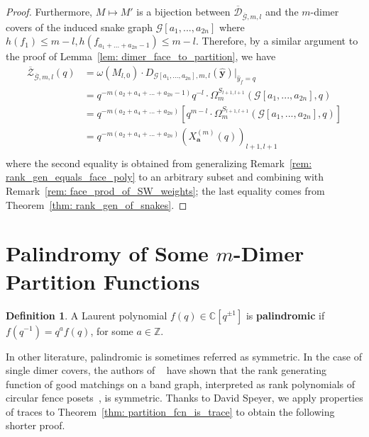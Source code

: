 \documentclass[11pt]{amsart}
\theoremstyle{definition}
\newtheorem{defn}[thm]{Definition}
\theoremstyle{remark}
\numberwithin{equation}{section}
\begin{document}
\begin{proof}
    Furthermore, $M\mapsto M'$ is a bijection between $\overline{\mathcal{D}}_{\overline{\mathcal{G}},m,l}$ and the $m$-dimer covers of the induced snake graph $\mathcal{G}[a_1,...,a_{2n}]$ where $h(f_1)\leq m-l, h(f_{a_1+...+a_{2n}-1})\leq m-l$. Therefore, by a similar argument to the proof of Lemma~\ref{lem: dimer_face_to_partition}, we have
    \begin{equation*}
        \begin{split}
            \overline{\mathcal{Z}}_{\overline{\mathcal{G}},m,l}(q) &= \omega(M_{l,0})\cdot D_{\mathcal{G}[a_1,...,a_{2n}],m,l}(\hat{\mathbf{y}})|_{\hat{y}_f = q}\\
            &= q^{-m(a_2+a_4+...+a_{2n} - 1)}q^{-l}\cdot \Omega^{S_{l+1,l+1}}_m(\mathcal{G}[a_1,...,a_{2n}],q)\\
            &= q^{-m(a_2+a_4+...+a_{2n})}[q^{m-l}\cdot \Omega^{S_{l+1,l+1}}_m(\mathcal{G}[a_1,...,a_{2n}],q)]\\
            &= q^{-m(a_2+a_4+...+a_{2n})}(X^{(m)}_{\mathbf{a}}(q))_{l+1,l+1}\\
        \end{split}
    \end{equation*}
    where the second equality is obtained from generalizing Remark~\ref{rem: rank_gen_equals_face_poly} to an arbitrary subset and combining with Remark~\ref{rem: face_prod_of_SW_weights}; the last equality comes from Theorem~\ref{thm: rank_gen_of_snakes}.
\end{proof}


\section{Palindromy of Some $m$-Dimer Partition Functions}\label{sec: palindromy}

\begin{defn}
    A Laurent polynomial $f(q)\in \mathbb{C}[q^{\pm1}]$ is \textbf{palindromic} if $f(q^{-1}) = q^{a}f(q)$, for some $a\in\mathbb{Z}$.
\end{defn}

In other literature, palindromic is sometimes referred as symmetric. In the case of single dimer covers, the authors of ~\cite{fence_posets} have shown that the rank generating function of good matchings on a band graph, interpreted as rank polynomials of circular fence posets~\cite{musiker2013bases}, is symmetric. Thanks to David Speyer, we apply properties of traces to Theorem~\ref{thm: partition_fcn_is_trace} to obtain the following shorter proof.
\end{document}
